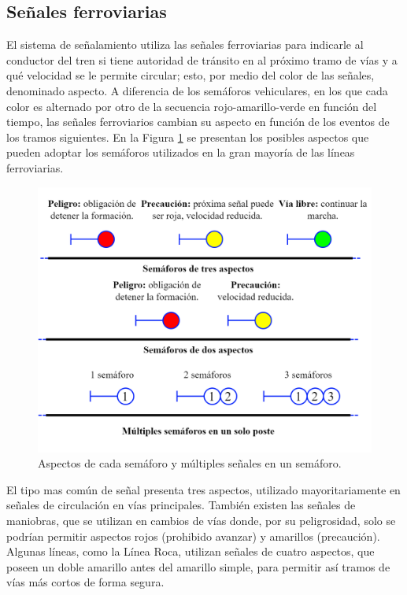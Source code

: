 \subsection{Señales ferroviarias}
    \label{sec:signals}
    
    El sistema de señalamiento utiliza las señales ferroviarias para indicarle al conductor del tren si tiene autoridad de tránsito en al próximo tramo de vías y a qué velocidad se le permite circular; esto, por medio del color de las señales, denominado aspecto. A diferencia de los semáforos vehiculares, en los que cada color es alternado por otro de la secuencia rojo-amarillo-verde en función del tiempo, las señales ferroviarios cambian su aspecto en función de los eventos de los tramos siguientes. En la Figura \ref{fig:signal_1} se presentan los posibles aspectos que pueden adoptar los semáforos utilizados en la gran mayoría de las líneas ferroviarias.

    \begin{figure}[H]
        \centering
        \includegraphics[width=1\textwidth]{Figuras/semaforo3}
        \centering\caption{Aspectos de cada semáforo y múltiples señales en un semáforo.}
        \label{fig:signal_1}
    \end{figure}

    El tipo mas común de señal presenta tres aspectos, utilizado mayoritariamente en señales de circulación en vías principales. También existen las señales de maniobras, que se utilizan en cambios de vías donde, por su peligrosidad, solo se podrían permitir aspectos rojos (prohibido avanzar) y amarillos (precaución). Algunas líneas, como la Línea Roca, utilizan señales de cuatro aspectos, que poseen un doble amarillo antes del amarillo simple, para permitir así tramos de vías más cortos de forma segura.

